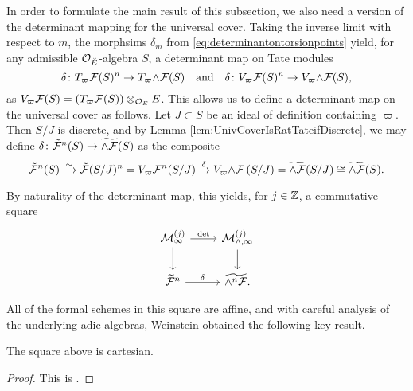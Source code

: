 \documentclass[../main.tex]{subfiles}
\begin{document}
In order to formulate the main result of this subsection, we also need a 
version of the determinant mapping for the universal cover. 
Taking the inverse limit with respect to $m$, the morphsims $\delta_m$ from
\eqref{eq:determinantontorsionpoints} yield, for any 
admissible $\mathcal{O}_{\breve {E}}$-algebra $S$, a determinant map on Tate modules
\begin{equation*}
  \delta \colon T_\varpi \mathcal{F} (S)^n \to T_\varpi {\wedge \mathcal{F}} (S) \quad \text{and} \quad
  \delta \colon V_\varpi \mathcal{F} (S)^n \to V_\varpi {\wedge \mathcal{F}} (S),
\end{equation*}
as $V_\varpi \mathcal{F}(S) = (T_\varpi \mathcal{F}(S))\otimes_{\mathcal{O}_E} E$. This allows us to define a 
determinant map on the universal cover as follows. Let $J \subset S$ be an ideal
of definition containing $\varpi$. Then
$S/J$ is discrete, and by Lemma \ref{lem:UnivCoverIsRatTateifDiscrete}, we may
define $\delta \colon \tilde {\mathcal{F}}^n(S) \to \widetilde {\wedge \mathcal{F}}(S)$
as the composite
\begin{equation*}
  \tilde {\mathcal{F}}^n(S) \xrightarrow{\sim} \tilde {\mathcal{F}}(S/J)^n = V_\varpi \mathcal{F}^n(S/J) 
  \xrightarrow{\delta} V_\varpi {\wedge \mathcal{F}}\, (S/J) = \widetilde {\wedge \mathcal{F}}(S/J) 
  \cong \widetilde {\wedge \mathcal{F}}(S).
\end{equation*}

By naturality of the determinant map, this yields, for
$j \in \mathbb{Z}$, a commutative square 
\begin{equation*}
    \begin{tikzcd}[ampersand replacement=\&]
      {\cM_\infty^{(j)}} \& {\cM_{\wedge, \infty}^{(j)}} \\
    	{\widetilde \cF^n} \& {\widetilde{\wedge^n \cF}.}
    	\arrow["\det", from=1-1, to=1-2]
    	\arrow[from=1-1, to=2-1]
    	\arrow[from=1-2, to=2-2]
    	\arrow["\delta", from=2-1, to=2-2]
    \end{tikzcd}
\end{equation*}

All of the formal schemes in this square are affine, and with careful analysis
of the underlying adic algebras, Weinstein obtained the following key
result.

\begin{thm}\label{thm:WeinsteinsCartesianSquare}
  The square above is cartesian.
  \begin{proof}
  This is \cite[Theorem 2.17]{weinstein2016semistable}.
\end{proof}
\end{thm}
\end{document}
